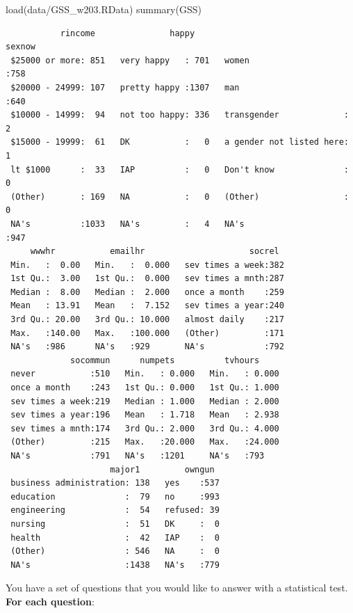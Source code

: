 \documentclass[
  letterpaper,
  DIV=11,
  numbers=noendperiod]{scrreprt}
\newenvironment{Shaded}{\begin{snugshade}}{\end{snugshade}}
\newcommand{\FunctionTok}[1]{\textcolor[rgb]{0.28,0.35,0.67}{#1}}
\newcommand{\NormalTok}[1]{\textcolor[rgb]{0.00,0.23,0.31}{#1}}
\newcommand{\StringTok}[1]{\textcolor[rgb]{0.13,0.47,0.30}{#1}}
\begin{document}
\begin{Shaded}
\begin{Highlighting}[]
\FunctionTok{load}\NormalTok{(}\StringTok{\textquotesingle{}data/GSS\_w203.RData\textquotesingle{}}\NormalTok{)}
\FunctionTok{summary}\NormalTok{(GSS)}
\end{Highlighting}
\end{Shaded}

\begin{verbatim}
           rincome               happy                           sexnow   
 $25000 or more: 851   very happy   : 701   women                   :758  
 $20000 - 24999: 107   pretty happy :1307   man                     :640  
 $10000 - 14999:  94   not too happy: 336   transgender             :  2  
 $15000 - 19999:  61   DK           :   0   a gender not listed here:  1  
 lt $1000      :  33   IAP          :   0   Don't know              :  0  
 (Other)       : 169   NA           :   0   (Other)                 :  0  
 NA's          :1033   NA's         :   4   NA's                    :947  
     wwwhr           emailhr                     socrel   
 Min.   :  0.00   Min.   :  0.000   sev times a week:382  
 1st Qu.:  3.00   1st Qu.:  0.000   sev times a mnth:287  
 Median :  8.00   Median :  2.000   once a month    :259  
 Mean   : 13.91   Mean   :  7.152   sev times a year:240  
 3rd Qu.: 20.00   3rd Qu.: 10.000   almost daily    :217  
 Max.   :140.00   Max.   :100.000   (Other)         :171  
 NA's   :986      NA's   :929       NA's            :792  
             socommun      numpets          tvhours      
 never           :510   Min.   : 0.000   Min.   : 0.000  
 once a month    :243   1st Qu.: 0.000   1st Qu.: 1.000  
 sev times a week:219   Median : 1.000   Median : 2.000  
 sev times a year:196   Mean   : 1.718   Mean   : 2.938  
 sev times a mnth:174   3rd Qu.: 2.000   3rd Qu.: 4.000  
 (Other)         :215   Max.   :20.000   Max.   :24.000  
 NA's            :791   NA's   :1201     NA's   :793     
                     major1         owngun   
 business administration: 138   yes    :537  
 education              :  79   no     :993  
 engineering            :  54   refused: 39  
 nursing                :  51   DK     :  0  
 health                 :  42   IAP    :  0  
 (Other)                : 546   NA     :  0  
 NA's                   :1438   NA's   :779  
\end{verbatim}

You have a set of questions that you would like to answer with a
statistical test. \textbf{For each question}:
\end{document}
